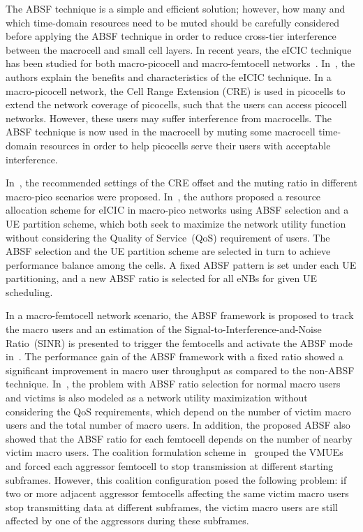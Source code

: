 \documentclass[paper]{ieice}
\begin{document}
The ABSF technique is a simple and efficient solution; however, how many and which time-domain resources need to be muted should be carefully considered before applying the ABSF technique in order to reduce cross-tier interference between the macrocell and small cell layers. In recent years, the eICIC technique has been studied for both macro-picocell and macro-femtocell networks~\cite{David2011a,MIKI2012}. In~\cite{Pedersen12}, the authors explain the benefits and characteristics of the eICIC technique. In a macro-picocell network, the Cell Range Extension (CRE) is used in picocells to extend the network coverage of picocells, such that the users can access picocell networks. However, these users may suffer interference from macrocells. The ABSF technique is now used in the macrocell by muting some macrocell time-domain resources in order to help picocells serve their users with acceptable interference.

In~\cite{Wang2012,Madan2010}, the recommended settings of the CRE offset and the muting ratio in different macro-pico scenarios were proposed. In~\cite{Jiang2012}, the authors proposed a resource allocation scheme for eICIC in macro-pico networks using ABSF selection and a UE partition scheme, which both seek to maximize the network utility function without considering the Quality of Service~(QoS) requirement of users. The ABSF selection and the UE partition scheme are selected in turn to achieve performance balance among the cells. A fixed ABSF pattern is set under each UE partitioning, and a new ABSF ratio is selected for all eNBs for given UE scheduling.

In a macro-femtocell network scenario, the ABSF framework is proposed to track the macro users and an estimation of the Signal-to-Interference-and-Noise Ratio~(SINR) is presented to trigger the femtocells and activate the ABSF mode in~\cite{Kamel2012}. The performance gain of the ABSF framework with a fixed ratio showed a significant improvement in macro user throughput as compared to the non-ABSF technique. In~\cite{Kamel2013}, the problem with ABSF ratio selection for normal macro users and victims is also modeled as a network utility maximization without considering the QoS requirements, which depend on the number of victim macro users and the total number of macro users. In addition, the proposed ABSF also showed that the ABSF ratio for each femtocell depends on the number of nearby victim macro users. The coalition formulation scheme in~\cite{Kamel2013} grouped the VMUEs and forced each aggressor femtocell to stop transmission at different starting subframes. However, this coalition configuration posed the following problem: if two or more adjacent aggressor femtocells affecting the same victim macro users stop transmitting data at different subframes, the victim macro users are still affected by one of the aggressors during these subframes.
\end{document}
